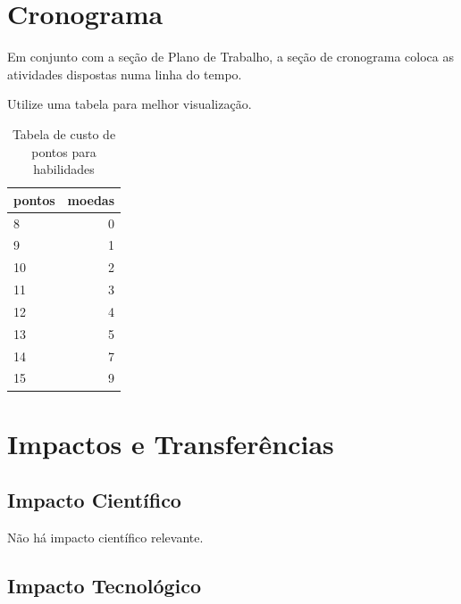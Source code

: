 \documentclass[a4paper,10pt]{article} %
\begin{document}
\section{Cronograma}

Em conjunto com a seção de Plano de Trabalho, a seção de cronograma coloca as atividades dispostas numa linha do tempo.

Utilize uma tabela para melhor visualização.

\begin{table}
\begin{center}
 \caption{Tabela de custo de pontos para habilidades}
\begin{tabular}{|l|r|}
  \hline \hline
  pontos & moedas \\ \hline \hline
   8 & 0 \\ \hline
   9 & 1 \\ \hline
  10 & 2 \\ \hline
  11 & 3 \\ \hline
  12 & 4 \\ \hline
  13 & 5 \\ \hline
  14 & 7 \\ \hline
  15 & 9 \\ \hline \hline
\end{tabular} 
\label{tab:resultados}
\end{center}
\end{table}


\section{Impactos e Transferências}

\subsection{Impacto Científico}

Não há impacto científico relevante.

\subsection{Impacto Tecnológico}
\end{document}
